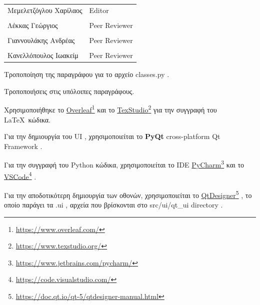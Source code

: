 \documentclass{../ol-softwaremanual}
\newcommand{\doclink}[2]{\href{#1}{#2}\footnote{\url{#1}}}
\begin{document}
	
	\vspace{20pt}
	
	\begin{table}[htbp!]
		\begin{tabular}{ll}
			Μεμελετζόγλου Χαρίλαος & \en Editor \\
			\\ Λέκκας Γεώργιος      &   \en  Peer Reviewer \\
			\\ Γιαννουλάκης Ανδρέας & \en Peer Reviewer \\
			\\ Κανελλόπουλος Ιωακείμ & \en Peer Reviewer \\ 
		\end{tabular}
	\end{table}
	
	\vspace{10pt}
	\vspace{10pt}
	\flushleft
	

	Τροποποίηση της παραγράφου για το αρχείο \en classes.py \gr . \break
	
	Τροποποιήσεις στις υπόλοιπες παραγράφους.	\break
	

	
	\newpage
	
	
	\vspace{20pt}
	\flushleft
	Χρησιμοποιήθηκε το \en \doclink{https://www.overleaf.com/}{Overleaf} \gr και το \en \doclink{https://www.texstudio.org/}{TexStudio} \gr για την συγγραφή του \LaTeX\ κώδικα. \break
	
	Για την δημιουργία του \en UI \gr, χρησιμοποιείται το \en \textbf{PyQt} cross-platform Qt Framework \gr. \break
	
	Για την συγγραφή του \en Python \gr κώδικα, χρησιμοποιείται το \en IDE \doclink{https://www.jetbrains.com/pycharm/}{PyCharm} \gr και το \en \doclink{https://code.visualstudio.com/}{VSCode} \gr .  \break 
	
	Για την αποδοτικότερη δημιουργία των οθονών, χρησιμοποιείται το \en \doclink{https://doc.qt.io/qt-5/qtdesigner-manual.html}{QtDesigner} \gr, το οποίο παράγει τα \en .ui \gr, αρχεία που βρίσκονται στο \en src/ui/qt\_ui directory \gr . \break
	
	
	\newpage
	
	
	
\end{document}
